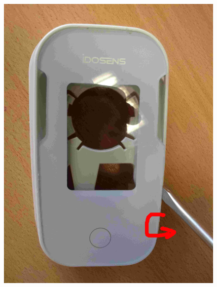 \documentclass{article}
\begin{document}
\begin{figure}[H]
\begin{center}
\advance\leftskip-3cm
\advance\rightskip-3cm
\includegraphics[keepaspectratio=true,scale=0.1]{remettre_ecran_idosens.jpg}
\label{visina8}
\end{center}\end{figure}
\end{document}
